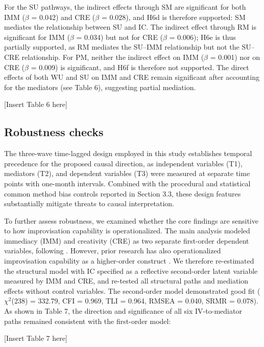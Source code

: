 \documentclass[authoryear,preprint,review,times,10pt]{elsarticle}
\begin{document}
For the SU pathways, the indirect effects through SM are significant for both IMM ($\beta$ = 0.042) and CRE ($\beta$ = 0.028), and H6d is therefore supported: SM mediates the relationship between SU and IC. The indirect effect through RM is significant for IMM ($\beta$ = 0.034) but not for CRE ($\beta$ = 0.006); H6e is thus partially supported, as RM mediates the SU--IMM relationship but not the SU--CRE relationship. For PM, neither the indirect effect on IMM ($\beta$ = 0.001) nor on CRE ($\beta$ = 0.009) is significant, and H6f is therefore not supported. The direct effects of both WU and SU on IMM and CRE remain significant after accounting for the mediators (see Table 6), suggesting partial mediation.

\begin{center}[Insert Table 6 here]\end{center}

\subsection{Robustness checks}
The three-wave time-lagged design employed in this study establishes temporal precedence for the proposed causal direction, as independent variables (T1), mediators (T2), and dependent variables (T3) were measured at separate time points with one-month intervals. Combined with the procedural and statistical common method bias controls reported in Section 3.3, these design features substantially mitigate threats to causal interpretation.

To further assess robustness, we examined whether the core findings are sensitive to how improvisation capability is operationalized. The main analysis modeled immediacy (IMM) and creativity (CRE) as two separate first-order dependent variables, following \citet{magni2009Role}. However, prior research has also operationalized improvisation capability as a higher-order construct \citep{charoensukmongkol2019Entrepreneurial}. We therefore re-estimated the structural model with IC specified as a reflective second-order latent variable measured by IMM and CRE, and re-tested all structural paths and mediation effects without control variables. The second-order model demonstrated good fit ($\chi^{2}$(238) = 332.79, CFI = 0.969, TLI = 0.964, RMSEA = 0.040, SRMR = 0.078). As shown in Table 7, the direction and significance of all six IV-to-mediator paths remained consistent with the first-order model:

\begin{center}[Insert Table 7 here]\end{center}
\end{document}
